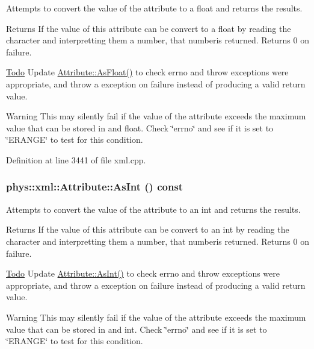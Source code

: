 Attempts to convert the value of the attribute to a float and returns the results. 

\begin{DoxyReturn}{Returns}
If the value of this attribute can be convert to a float by reading the character and interpretting them a number, that numberis returned. Returns 0 on failure. 
\end{DoxyReturn}
\begin{Desc}
\item[\hyperlink{todo__todo000046}{Todo}]Update \hyperlink{classphys_1_1xml_1_1Attribute_aad74f805b9318735011d698ee39113aa}{Attribute::AsFloat()} to check errno and throw exceptions were appropriate, and throw a exception on failure instead of producing a valid return value. \end{Desc}
\begin{DoxyWarning}{Warning}
This may silently fail if the value of the attribute exceeds the maximum value that can be stored in and float. Check \char`\"{}errno\char`\"{} and see if it is set to \char`\"{}ERANGE\char`\"{} to test for this condition. 
\end{DoxyWarning}


Definition at line 3441 of file xml.cpp.

\hypertarget{classphys_1_1xml_1_1Attribute_ada1f2e45ce636ad8482972263364e7fa}{
\subsubsection[{AsInt}]{\setlength{\rightskip}{0pt plus 5cm}phys::xml::Attribute::AsInt () const}}
\label{da/ddf/classphys_1_1xml_1_1Attribute_ada1f2e45ce636ad8482972263364e7fa}


Attempts to convert the value of the attribute to an int and returns the results. 

\begin{DoxyReturn}{Returns}
If the value of this attribute can be convert to an int by reading the character and interpretting them a number, that numberis returned. Returns 0 on failure. 
\end{DoxyReturn}
\begin{Desc}
\item[\hyperlink{todo__todo000043}{Todo}]Update \hyperlink{classphys_1_1xml_1_1Attribute_ada1f2e45ce636ad8482972263364e7fa}{Attribute::AsInt()} to check errno and throw exceptions were appropriate, and throw a exception on failure instead of producing a valid return value. \end{Desc}
\begin{DoxyWarning}{Warning}
This may silently fail if the value of the attribute exceeds the maximum value that can be stored in and int. Check \char`\"{}errno\char`\"{} and see if it is set to \char`\"{}ERANGE\char`\"{} to test for this condition. 
\end{DoxyWarning}


